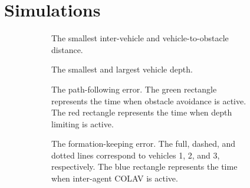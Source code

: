 \section{Simulations}
\label{sec:NSB_R_simulation}
\begin{figure}[ht]
    \centering
    \begin{subfigure}[t]{0.475\textwidth}
        \centering
        
        \vspace{-8mm}
        \caption{The smallest inter-vehicle and vehicle-to-obstacle distance.}
        \label{fig:NSB_R_distances}
        \vspace{-1mm}
    \end{subfigure}
    \hspace{1em}
    \begin{subfigure}[t]{0.475\textwidth}
        \centering
        
        \vspace{-8mm}
        \caption{The smallest and largest vehicle depth.}
        \label{fig:NSB_R_depth}
        \vspace{-1mm}
    \end{subfigure}
    \begin{subfigure}[t]{0.475\textwidth}
        \centering
        
        \vspace{-8mm}
        \caption{The path-following error. The green rectangle represents the time when obstacle avoidance is active. The red rectangle represents the time when depth limiting is active.}
        \label{fig:NSB_R_path_following_error}
        \vspace{-1mm}
    \end{subfigure}
    \hspace{1em}
    \begin{subfigure}[t]{0.475\textwidth}
        \centering
        
        \vspace{-8mm}
        \caption{The formation-keeping error. The full, dashed, and dotted lines correspond to vehicles 1, 2, and 3, respectively. The blue rectangle represents the time when inter-agent COLAV is active.}
        \label{fig:NSB_R_formation_keeping_error}
        \vspace{-1mm}
    \end{subfigure}
    \begin{subfigure}[t]{0.475\textwidth}
        \centering
        

\end{subfigure}
\end{figure}
